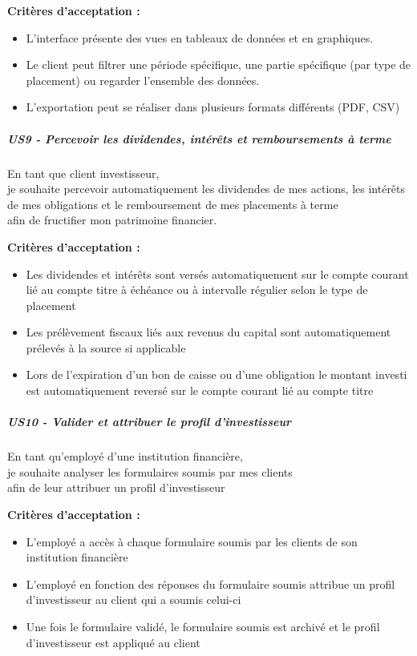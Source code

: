 \textbf{Critères d'acceptation :}

\begin{itemize}
\tightlist
\item
  L'interface présente des vues en tableaux de données et en graphiques.
\item
  Le client peut filtrer une période spécifique, une partie spécifique
  (par type de placement) ou regarder l'ensemble des données.
\item
  L'exportation peut se réaliser dans plusieurs formats différents (PDF,
  CSV)
\end{itemize}

\subparagraph{US9 - Percevoir les dividendes, intérêts et remboursements
à
terme}\label{us9---percevoir-les-dividendes-intuxe9ruxeats-et-remboursements-uxe0-terme}

En tant que client investisseur,\\
je souhaite percevoir automatiquement les dividendes de mes actions, les
intérêts de mes obligations et le remboursement de mes placements à
terme\\
afin de fructifier mon patrimoine financier.

\textbf{Critères d'acceptation :}

\begin{itemize}
\tightlist
\item
  Les dividendes et intérêts sont versés automatiquement sur le compte
  courant lié au compte titre à échéance ou à intervalle régulier selon
  le type de placement
\item
  Les prélèvement fiscaux liés aux revenus du capital sont
  automatiquement prélevés à la source si applicable
\item
  Lors de l'expiration d'un bon de caisse ou d'une obligation le montant
  investi est automatiquement reversé sur le compte courant lié au
  compte titre
\end{itemize}

\subparagraph{US10 - Valider et attribuer le profil
d'investisseur}\label{us10---valider-et-attribuer-le-profil-dinvestisseur}

En tant qu'employé d'une institution financière,\\
je souhaite analyser les formulaires soumis par mes clients\\
afin de leur attribuer un profil d'investisseur

\textbf{Critères d'acceptation :}

\begin{itemize}
\tightlist
\item
  L'employé a accès à chaque formulaire soumis par les clients de son
  institution financière
\item
  L'employé en fonction des réponses du formulaire soumis attribue un
  profil d'investisseur au client qui a soumis celui-ci
\item
  Une fois le formulaire validé, le formulaire soumis est archivé et le
  profil d'investisseur est appliqué au client
\end{itemize}

